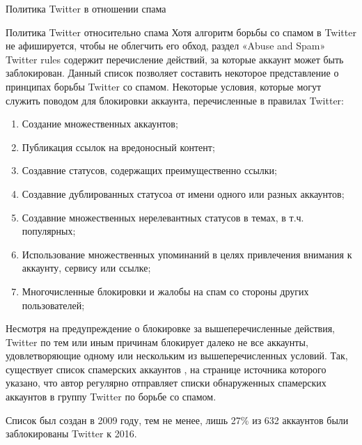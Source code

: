 \begin{section}{Политика Twitter в отношении спама}
\begin{subsection}{Политика Twitter относительно спама}
Хотя алгоритм борьбы со спамом в Twitter не афишируется,
чтобы не облегчить его обход, раздел «Abuse and Spam»
Twitter rules \cite{TwitterRules}
содержит перечисление действий,
за которые аккаунт может быть заблокирован.
Данный список позволяет составить некоторое представление о принципах борьбы Twitter со спамом. Некоторые условия, которые могут служить поводом для блокировки аккаунта, перечисленные в правилах Twitter:
\begin{enumerate}
  \item Создание множественных аккаунтов;
  \item Публикация ссылок на вредоносный контент;
  \item Создавние статусов, содержащих преимущественно ссылки;
  \item Создавние дублированных статусоа от имени одного или разных аккаунтов;
  \item Создавние множественных нерелевантных статусов в темах, в т.ч. популярных;
  \item Использование множественных упоминаний в целях привлечения внимания к аккаунту,
  сервису или ссылке;
  \item  Многочисленные блокировки и жалобы на спам со стороны других пользователей;
\end{enumerate}

Несмотря на предупреждение о блокировке за вышеперечисленные действия, Twitter по тем или иным причинам блокирует далеко не все аккаунты, удовлетворяющие одному или нескольким из вышеперечисленных условий. Так, существует список спамерских аккаунтов \cite{TwitterSpammers}, на странице источника которого указано, что автор регулярно отправляет списки обнаруженных спамерских аккаунтов в группу Twitter по борьбе со спамом.

Список был создан в 2009 году, тем не менее, лишь 27\% из 632 аккаунтов были заблокированы Twitter к 2016.

\end{subsection}




\end{section}
